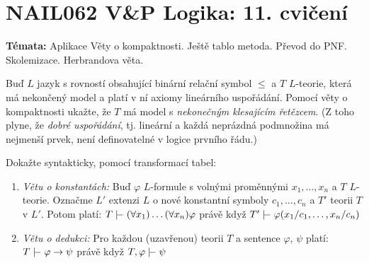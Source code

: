 \documentclass[a4paper,12pt]{article}
\begin{document}
\section*{NAIL062 V\&P Logika: 11. cvičení}



\textbf{Témata:} Aplikace Věty o kompaktnosti. Ještě tablo metoda. Převod do PNF. Skolemizace. Herbrandova věta.



\medskip\begin{problem} Buď $L$ jazyk s rovností obsahující binární relační symbol $\le$ a $T$ $L$-teorie, která má nekončený model a platí v ní axiomy lineárního uspořádání. Pomocí věty o kompaktnosti ukažte, že $T$ má model 
    s \emph{nekonečným klesajícím řetězcem}.
    (Z toho plyne, že \emph{dobré uspořádání}, tj. lineární a každá neprázdná podmnožina má nejmenší prvek, není definovatelné v logice prvního řádu.)
\end{problem}

\medskip\begin{problem} Dokažte syntakticky, pomocí transformací tabel:
    \begin{enumerate}
        \item {\it Větu o konstantách:} Buď $\varphi$ $L$-formule s volnými proměnnými $x_1,\dots,x_n$ a $T$ $L$-teorie. Označme $L'$ extenzi $L$ o nové konstantní symboly $c_1,\dots,c_n$ a $T'$ teorii $T$ v $L'$. Potom platí:
        $T \proves (\forall x_1)\dots(\forall x_n)\varphi$ právě když $T'\proves\varphi(x_1/c_1,\dots,x_n/c_n)$
        \item {\it Větu o dedukci:} Pro každou (uzavřenou) teorii $T$ a sentence $\varphi$, $\psi$ platí: $T\proves \varphi\to\psi$ právě když $T,\varphi\proves\psi$
    \end{enumerate}
    \end{problem} 
\end{document}
